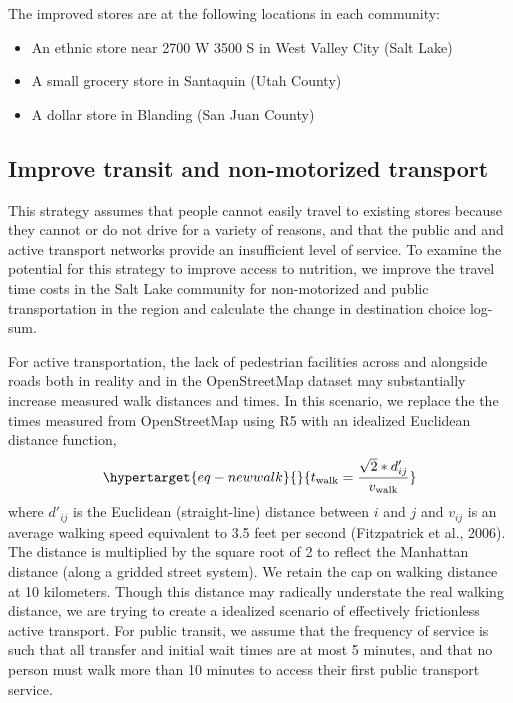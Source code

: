 \documentclass[
  letterpaper,
  DIV=11,
  numbers=noendperiod]{scrreport}
\providecommand{\tightlist}{%
  \setlength{\itemsep}{0pt}\setlength{\parskip}{0pt}}\usepackage{longtable,booktabs,array}
\begin{document}
The improved stores are at the following locations in each community:

\begin{itemize}
\tightlist
\item
  An ethnic store near 2700 W 3500 S in West Valley City (Salt Lake)
\item
  A small grocery store in Santaquin (Utah County)
\item
  A dollar store in Blanding (San Juan County)
\end{itemize}

\hypertarget{improve-transit-and-non-motorized-transport}{%
\subsection{Improve transit and non-motorized
transport}\label{improve-transit-and-non-motorized-transport}}

This strategy assumes that people cannot easily travel to existing
stores because they cannot or do not drive for a variety of reasons, and
that the public and and active transport networks provide an
insufficient level of service. To examine the potential for this
strategy to improve access to nutrition, we improve the travel time
costs in the Salt Lake community for non-motorized and public
transportation in the region and calculate the change in destination
choice log-sum.

For active transportation, the lack of pedestrian facilities across and
alongside roads both in reality and in the OpenStreetMap dataset may
substantially increase measured walk distances and times. In this
scenario, we replace the the times measured from OpenStreetMap using R5
with an idealized Euclidean distance function,
\begin{equation}\protect\hypertarget{eq-newwalk}{}{
t_{\mathrm{walk}} = \frac{\sqrt{2} * d'_{ij}}{v_{\mathrm{walk}}}
}\label{eq-newwalk}\end{equation} where \(d'_{ij}\) is the Euclidean
(straight-line) distance between \(i\) and \(j\) and \(v_{ij}\) is an
average walking speed equivalent to 3.5 feet per second (Fitzpatrick et
al., 2006). The distance is multiplied by the square root of 2 to
reflect the Manhattan distance (along a gridded street system). We
retain the cap on walking distance at 10 kilometers. Though this
distance may radically understate the real walking distance, we are
trying to create a idealized scenario of effectively frictionless active
transport. For public transit, we assume that the frequency of service
is such that all transfer and initial wait times are at most 5 minutes,
and that no person must walk more than 10 minutes to access their first
public transport service.
\end{document}
